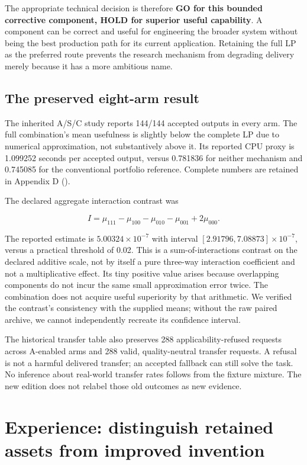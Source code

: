 The appropriate technical decision is therefore \textbf{GO for this
bounded corrective component, HOLD for superior useful capability}. A
component can be correct and useful for engineering the broader system
without being the best production path for its current application.
Retaining the full LP as the preferred route prevents the research
mechanism from degrading delivery merely because it has a more ambitious
name.

\subsection{The preserved eight-arm
result}\label{the-preserved-eight-arm-result}

The inherited A/S/C study reports 144/144 accepted outputs in every arm.
The full combination's mean usefulness is slightly below the complete LP
due to numerical approximation, not substantively above it. Its reported
CPU proxy is 1.099252 seconds per accepted output, versus 0.781836 for
neither mechanism and 0.745085 for the conventional portfolio reference.
Complete numbers are retained in Appendix D ().

The declared aggregate interaction contrast was

\[
I=\mu_{111}-\mu_{100}-\mu_{010}-\mu_{001}+2\mu_{000}.
\]

The reported estimate is \(5.00324\times10^{-7}\) with interval
\([2.91796,7.08873]\times10^{-7}\), versus a practical threshold of
0.02. This is a sum-of-interactions contrast on the declared additive
scale, not by itself a pure three-way interaction coefficient and not a
multiplicative effect. Its tiny positive value arises because
overlapping components do not incur the same small approximation error
twice. The combination does not acquire useful superiority by that
arithmetic. We verified the contrast's consistency with the supplied
means; without the raw paired archive, we cannot independently recreate
its confidence interval.

The historical transfer table also preserves 288 applicability-refused
requests across A-enabled arms and 288 valid, quality-neutral transfer
requests. A refusal is not a harmful delivered transfer; an accepted
fallback can still solve the task. No inference about real-world
transfer rates follows from the fixture mixture. The new edition does
not relabel those old outcomes as new evidence.

\section{Experience: distinguish retained assets from improved
invention}\label{experience}

